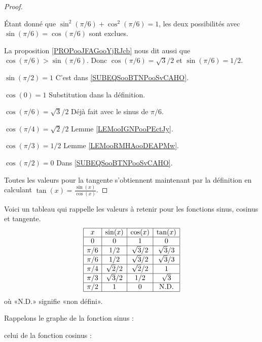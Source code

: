 \begin{proof}
\begin{subproof}
            Étant donné que \( \sin^2(\pi/6)+\cos^2(\pi/6)=1\), les deux possibilités avec \( \sin(\pi/6)=\cos(\pi/6)\) sont exclues.

            La proposition \ref{PROPooJFAGooYjRJcb} nous dit aussi que \( \cos(\pi/6)>\sin(\pi/6)\). Donc \( \cos(\pi/6)=\sqrt{ 3 }/2\) et \( \sin(\pi/6)=1/2\).
        \item[$\sin(\pi/2)=1 $] C'est dans \eqref{SUBEQSooBTNPooSvCAHO}.
        \item[$\cos(0)=1 $] Substitution dans la définition.
        \item[$\cos(\pi/6)=\sqrt{ 3 }/2 $] Déjà fait avec le sinus de \( \pi/6\).
        \item[$\cos(\pi/4)=\sqrt{ 2 }/2 $]  Lemme \ref{LEMooIGNPooPEctJy}.
        \item[$\cos(\pi/3)=1/2 $] Lemme \ref{LEMooRMHAooDEAPMw}.
        \item[$\cos(\pi/2)=0 $] Dans \eqref{SUBEQSooBTNPooSvCAHO}.
    \end{subproof}
    Toutes les valeurs pour la tangente s'obtiennent maintenant par la définition en calculant \( \tan(x)=\frac{ \sin(x) }{ \cos(x) }\).
\end{proof}

Voici un tableau qui rappelle les valeurs à retenir pour les fonctions sinus, cosinus et tangente.
\begin{equation}\label{PGooIMQFooTnBdIl}
    \begin{array}[]{|c|c|c|c|}
      \hline
      x&\sin(x)&\cos(x)&\tan(x)\\
      \hline
      0&0&1&0\\
      \hline
      \pi/6&1/2&\sqrt{3}/2&\sqrt{3}/3\\
      \hline
      \pi/6&1/2&\sqrt{3}/2&\sqrt{3}/3\\
      \hline
      \pi/4&\sqrt{2}/2&\sqrt{2}/2&1\\
      \hline
      \pi/3&\sqrt{3}/2&1/2&\sqrt{3}\\
      \hline
      \pi/2&1&0&\text{N.D.}\\
      \hline
    \end{array}
\end{equation}
où «N.D.»  signifie «non défini».

Rappelons le graphe de la fonction sinus :
\begin{center}
   
\end{center}
celui de la fonction cosinus :
\begin{center}
   
\end{center}


